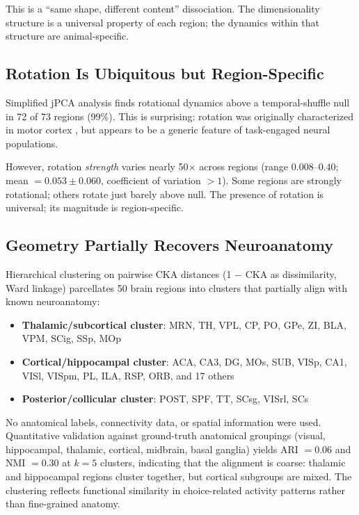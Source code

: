 \documentclass{article}
\begin{document}
This is a ``same shape, different content'' dissociation. The dimensionality structure is a universal property of each region; the dynamics within that structure are animal-specific.

\subsection{Rotation Is Ubiquitous but Region-Specific}

Simplified jPCA analysis finds rotational dynamics above a temporal-shuffle null in 72 of 73 regions (99\%). This is surprising: rotation was originally characterized in motor cortex \citep{churchland2012neural}, but appears to be a generic feature of task-engaged neural populations.

However, rotation \emph{strength} varies nearly 50$\times$ across regions (range $0.008$--$0.40$; mean $= 0.053 \pm 0.060$, coefficient of variation $> 1$). Some regions are strongly rotational; others rotate just barely above null. The presence of rotation is universal; its magnitude is region-specific.

\subsection{Geometry Partially Recovers Neuroanatomy}

Hierarchical clustering on pairwise CKA distances (1 $-$ CKA as dissimilarity, Ward linkage) parcellates 50 brain regions into clusters that partially align with known neuroanatomy:

\begin{itemize}
\item \textbf{Thalamic/subcortical cluster}: MRN, TH, VPL, CP, PO, GPe, ZI, BLA, VPM, SCig, SSp, MOp
\item \textbf{Cortical/hippocampal cluster}: ACA, CA3, DG, MOs, SUB, VISp, CA1, VISl, VISpm, PL, ILA, RSP, ORB, and 17 others
\item \textbf{Posterior/collicular cluster}: POST, SPF, TT, SCsg, VISrl, SCs
\end{itemize}

No anatomical labels, connectivity data, or spatial information were used. Quantitative validation against ground-truth anatomical groupings (visual, hippocampal, thalamic, cortical, midbrain, basal ganglia) yields ARI $= 0.06$ and NMI $= 0.30$ at $k = 5$ clusters, indicating that the alignment is coarse: thalamic and hippocampal regions cluster together, but cortical subgroups are mixed. The clustering reflects functional similarity in choice-related activity patterns rather than fine-grained anatomy.
\end{document}

